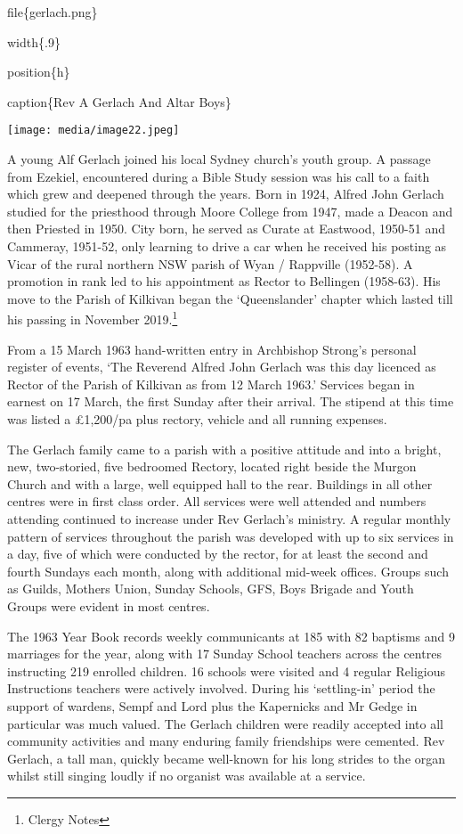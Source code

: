 file\{gerlach.png\}

width\{.9\}

position\{h\}

caption\{Rev A Gerlach And Altar Boys\}

\texttt{[image: media/image22.jpeg]}

A young Alf Gerlach joined his local Sydney church's youth group. A
passage from Ezekiel, encountered during a Bible Study session was his
call to a faith which grew and deepened through the years. Born in 1924,
Alfred John Gerlach studied for the priesthood through Moore College
from 1947, made a Deacon and then Priested in 1950. City born, he served
as Curate at Eastwood, 1950-51 and Cammeray, 1951-52, only learning to
drive a car when he received his posting as Vicar of the rural northern
NSW parish of Wyan / Rappville (1952-58). A promotion in rank led to his
appointment as Rector to Bellingen (1958-63). His move to the Parish of
Kilkivan began the `Queenslander' chapter which lasted till his passing
in November 2019.\footnote{Clergy Notes}

From a 15 March 1963 hand-written entry in Archbishop Strong's personal
register of events, `The Reverend Alfred John Gerlach was this day
licenced as Rector of the Parish of Kilkivan as from 12 March 1963.'
Services began in earnest on 17 March, the first Sunday after their
arrival. The stipend at this time was listed a £1,200/pa plus rectory,
vehicle and all running expenses.

The Gerlach family came to a parish with a positive attitude and into a
bright, new, two-storied, five bedroomed Rectory, located right beside
the Murgon Church and with a large, well equipped hall to the rear.
Buildings in all other centres were in first class order. All services
were well attended and numbers attending continued to increase under Rev
Gerlach's ministry. A regular monthly pattern of services throughout the
parish was developed with up to six services in a day, five of which
were conducted by the rector, for at least the second and fourth Sundays
each month, along with additional mid-week offices. Groups such as
Guilds, Mothers Union, Sunday Schools, GFS, Boys Brigade and Youth
Groups were evident in most centres.

The 1963 Year Book records weekly communicants at 185 with 82 baptisms
and 9 marriages for the year, along with 17 Sunday School teachers
across the centres instructing 219 enrolled children. 16 schools were
visited and 4 regular Religious Instructions teachers were actively
involved. During his `settling-in' period the support of wardens, Sempf
and Lord plus the Kapernicks and Mr Gedge in particular was much valued.
The Gerlach children were readily accepted into all community activities
and many enduring family friendships were cemented. Rev Gerlach, a tall
man, quickly became well-known for his long strides to the organ whilst
still singing loudly if no organist was available at a service.

